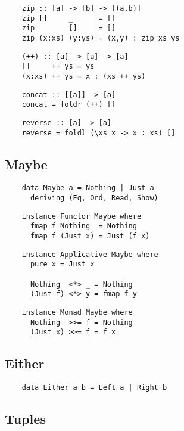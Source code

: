 \begin{multicols}{2}
	\begin{verbatim}
	zip :: [a] -> [b] -> [(a,b)]
	zip []     _      = []
	zip _      []     = []
	zip (x:xs) (y:ys) = (x,y) : zip xs ys
	\end{verbatim}
	
	\begin{verbatim}
	(++) :: [a] -> [a] -> [a]
	[]     ++ ys = ys
	(x:xs) ++ ys = x : (xs ++ ys)
	\end{verbatim}
	
	\begin{verbatim}
	concat :: [[a]] -> [a]
	concat = foldr (++) []
	\end{verbatim}
	
	\begin{verbatim}
	reverse :: [a] -> [a]
	reverse = foldl (\xs x -> x : xs) []
	\end{verbatim}
	
	\subsection*{Maybe}
	
	\begin{verbatim}
	data Maybe a = Nothing | Just a
	  deriving (Eq, Ord, Read, Show)
	\end{verbatim}
	
	\begin{verbatim}
	instance Functor Maybe where
	  fmap f Nothing  = Nothing
	  fmap f (Just x) = Just (f x)
	\end{verbatim}
	
	\begin{verbatim}
	instance Applicative Maybe where
	  pure x = Just x
	  
	  Nothing  <*> _ = Nothing
	  (Just f) <*> y = fmap f y
	\end{verbatim}
	
	\begin{verbatim}
	instance Monad Maybe where
	  Nothing  >>= f = Nothing
	  (Just x) >>= f = f x
	\end{verbatim}
	
	\subsection*{Either}
	
	\begin{verbatim}
	data Either a b = Left a | Right b
	\end{verbatim}
	
	\subsection*{Tuples}
	

\end{multicols}
